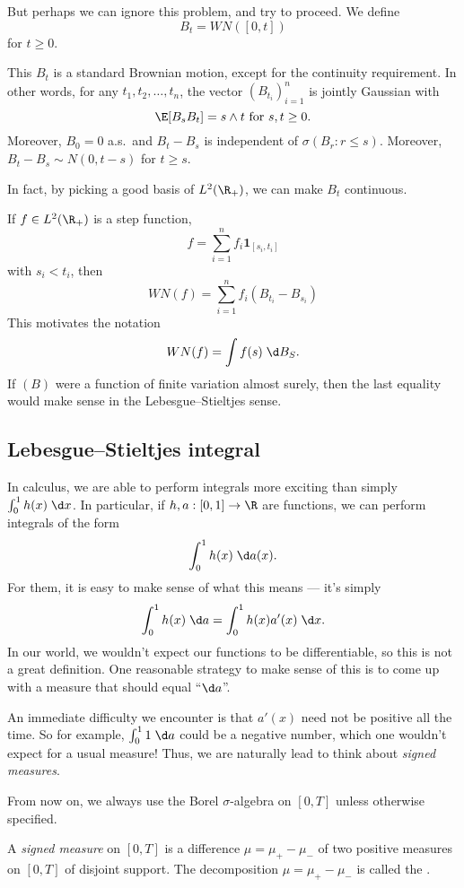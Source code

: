 \documentclass[a4paper]{article}
\begin{document}
But perhaps we can ignore this problem, and try to proceed. We define
\[
  B_t = WN([0, t])
\]
for $t \geq 0$.
\begin{ex}
  This $B_t$ is a standard Brownian motion, except for the continuity requirement. In other words, for any $t_1, t_2, \ldots, t_n$, the vector $(B_{t_i})_{i = 1}^n$ is jointly Gaussian with
  \[
    \E[B_s B_t] = s \wedge t\text{ for }s, t \geq 0.
  \]
  Moreover, $B_0 = 0$ a.s.\ and $B_t - B_s$ is independent of $\sigma(B_r: r \leq s)$. Moreover, $B_t - B_s \sim N(0, t - s)$ for $t \geq s$.
\end{ex}
In fact, by picking a good basis of $L^2(\R_+)$, we can make $B_t$ continuous.

If $f \in L^2(\R_+)$ is a step function,
\[
  f = \sum_{i = 1}^n f_i \mathbf{1}_{[s_i, t_i]}
\]
with $s_i < t_i$, then
\[
  WN(f) = \sum_{i = 1}^n f_i (B_{t_i} - B_{s_i})
\]
This motivates the notation
\[
  WN(f) = \int f(s)\; \d B_S.
\]
If $(B)$ were a function of finite variation almost surely, then the last equality would make sense in the Lebesgue--Stieltjes sense.

\subsection{Lebesgue--Stieltjes integral}
In calculus, we are able to perform integrals more exciting than simply $\int_0^1 h(x) \;\d x$. In particular, if $h, a: [0, 1] \to \R$ are functions, we can perform integrals of the form
\[
  \int_0^1 h(x) \;\d a(x).
\]
For them, it is easy to make sense of what this means --- it's simply
\[
  \int_0^1 h(x) \;\d a = \int_0^1 h(x) a'(x) \;\d x.
\]
In our world, we wouldn't expect our functions to be differentiable, so this is not a great definition. One reasonable strategy to make sense of this is to come up with a measure that should equal ``$\d a$''.

An immediate difficulty we encounter is that $a'(x)$ need not be positive all the time. So for example, $\int_0^1 1 \;\d a$ could be a negative number, which one wouldn't expect for a usual measure! Thus, we are naturally lead to think about \emph{signed measures}.

From now on, we always use the Borel $\sigma$-algebra on $[0, T]$ unless otherwise specified.
\begin{defi}
  A \emph{signed measure} on $[0, T]$ is a difference $\mu = \mu_+ - \mu_-$ of two positive measures on $[0, T]$ of disjoint support. The decomposition $\mu = \mu_+ - \mu_-$ is called the .
\end{defi}
\end{document}
